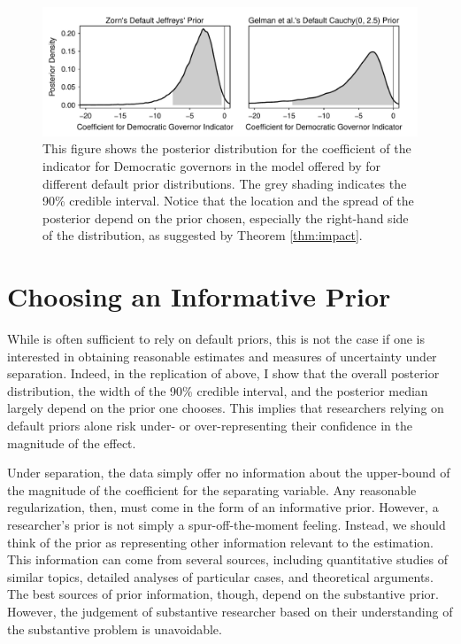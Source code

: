 \documentclass[12pt]{article}
\begin{document}
\begin{figure}[H]
\begin{center}
\includegraphics[scale = .8]{figs/br-posterior-density-illustrate-importance.pdf}
\caption{This figure shows the posterior distribution for the coefficient of the indicator for Democratic governors in the model offered by \cite{BarrilleauxRainey2014} for different default prior distributions. 
The grey shading indicates the 90\% credible interval. Notice that the location and the spread of the posterior depend on the prior chosen, especially the right-hand side of the distribution, as suggested by Theorem \ref{thm:impact}.}\label{fig:bf-posterior-density-illustrate-importance}
\end{center}
\end{figure}

\section*{Choosing an Informative Prior}

While is often sufficient to rely on default priors, this is not the case if one is interested in obtaining reasonable estimates and measures of uncertainty under separation. 
Indeed, in the replication of \cite{BarrilleauxRainey2014} above, I show that the overall posterior distribution, the width of the 90\% credible interval, and the posterior median largely depend on the prior one chooses. 
This implies that researchers relying on default priors alone risk under- or over-representing their confidence in the magnitude of the effect.

Under separation, the data simply offer no information about the upper-bound of the magnitude of the coefficient for the separating variable. 
Any reasonable regularization, then, must come in the form of an informative prior. 
However, a researcher's prior is not simply a spur-off-the-moment feeling. 
Instead, we should think of the prior as representing other information relevant to the estimation. 
This information can come from several sources, including quantitative studies of similar topics, detailed analyses of particular cases, and theoretical arguments.
The best sources of prior information, though, depend on the substantive prior. 
However, the judgement of substantive researcher based on their understanding of the substantive problem is unavoidable.
\end{document}
